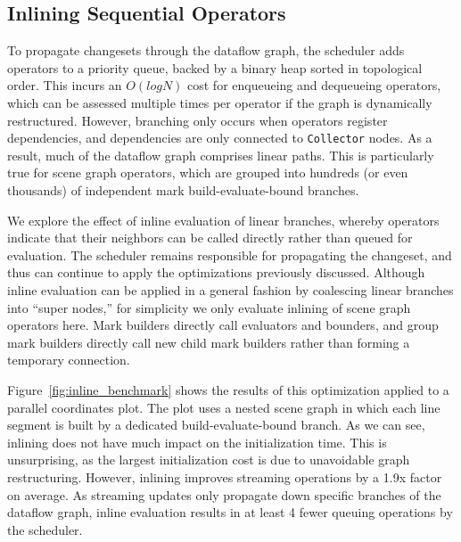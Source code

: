 \subsection{Inlining Sequential Operators}

To propagate changesets through the dataflow graph, the scheduler adds operators
to a priority queue, backed by a binary heap sorted in topological order. This
incurs an $O(log N)$ cost for enqueueing and dequeueing operators, which can be
assessed multiple times per operator if the graph is dynamically restructured.
However, branching only occurs when operators register dependencies, and
dependencies are only connected to \texttt{Collector} nodes. As a result, much
of the dataflow graph comprises linear paths. This is particularly true for
scene graph operators, which are grouped into hundreds (or even thousands) of
independent mark build-evaluate-bound branches.

We explore the effect of inline evaluation of linear branches, whereby operators
indicate that their neighbors can be called directly rather than queued for
evaluation. The scheduler remains responsible for propagating the changeset,
and thus can continue to apply the optimizations previously discussed. Although
inline evaluation can be applied in a general fashion by coalescing linear
branches into ``super nodes,'' for simplicity we only evaluate inlining of scene
graph operators here. Mark builders directly call evaluators and bounders, and
group mark builders directly call new child mark builders rather than forming a
temporary connection.

Figure~\ref{fig:inline_benchmark} shows the results of this optimization applied
to a parallel coordinates plot. The plot uses a nested scene graph in which each
line segment is built by a dedicated build-evaluate-bound branch. As we can see,
inlining does not have much impact on the initialization time. This is
unsurprising, as the largest initialization cost is due to unavoidable graph
restructuring. However, inlining improves streaming operations by a 1.9x factor
on average. As streaming updates only propagate down specific branches of the
dataflow graph, inline evaluation results in at least 4 fewer queuing operations
by the scheduler.
